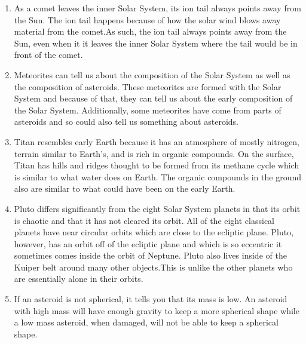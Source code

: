 \documentclass[../hw2.tex]{subfiles}
\begin{document}

    \begin{enumerate}
        \item {} As a comet leaves the inner Solar System, its ion tail always points away from the Sun. The ion tail happens because of how the solar wind blows away material from the comet.As such, the ion tail always points away from the Sun, even when it it leaves the inner Solar System where the tail would be in front of the comet. 
        \item {} Meteorites can tell us about the composition of the Solar System as well as the composition of asteroids.  These meteorites are formed with the Solar System and because of that, they can tell us about the early composition of the Solar System. Additionally, some meteorites have come from parts of asteroids and so could also tell us something about asteroids.
        \item {} Titan resembles early Earth because it has an atmosphere of mostly nitrogen, terrain similar to Earth's, and is rich in organic compounds. On the surface, Titan has hills and ridges thought to be formed from its methane cycle which is similar to what water does on Earth. The organic compounds in the ground also are similar to what could have been on the early Earth.
        \item {} Pluto differs significantly from the eight Solar System planets in that its orbit is chaotic and that it has not cleared its orbit. All of the eight classical planets have near circular orbits which are close to the ecliptic plane. Pluto, however, has an orbit off of the ecliptic plane and which is so eccentric it sometimes comes inside the orbit of Neptune. Pluto also lives inside of the Kuiper belt around many other objects.This is unlike the other planets who are essentially alone in their orbits.
        \item {} If an asteroid is not spherical, it tells you that its mass is low. An asteroid with high mass will have enough gravity to keep a more spherical shape while a low mass asteroid, when damaged, will not be able to keep a spherical shape.
    \end{enumerate}
    
\end{document}
